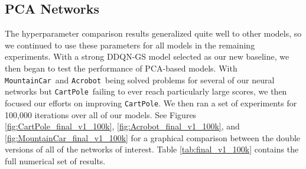 \documentclass[11pt]{article}
\newcommand{\cp}{\texttt{CartPole}}
\newcommand{\ab}{\texttt{Acrobot}}
\newcommand{\mc}{\texttt{MountainCar}}
\begin{document}
\subsection{PCA Networks}

The hyperparameter comparison results generalized quite well to other models, so we continued to use these parameters for all models in the remaining experiments. With a strong DDQN-GS model selected as our new baseline, we then began to test the performance of PCA-based models. With \mc~and \ab~being solved problems for several of our neural networks but \cp~failing to ever reach particularly large scores, we then focused our efforts on improving \cp. We then ran a set of experiments for 100,000 iterations over all of our models. See Figures \ref{fig:CartPole_final_v1_100k}, \ref{fig:Acrobot_final_v1_100k}, and \ref{fig:MountainCar_final_v1_100k} for a graphical comparison between the double versions of all of the networks of interest. Table \ref{tab:final_v1_100k} contains the full numerical set of results. 
\end{document}
